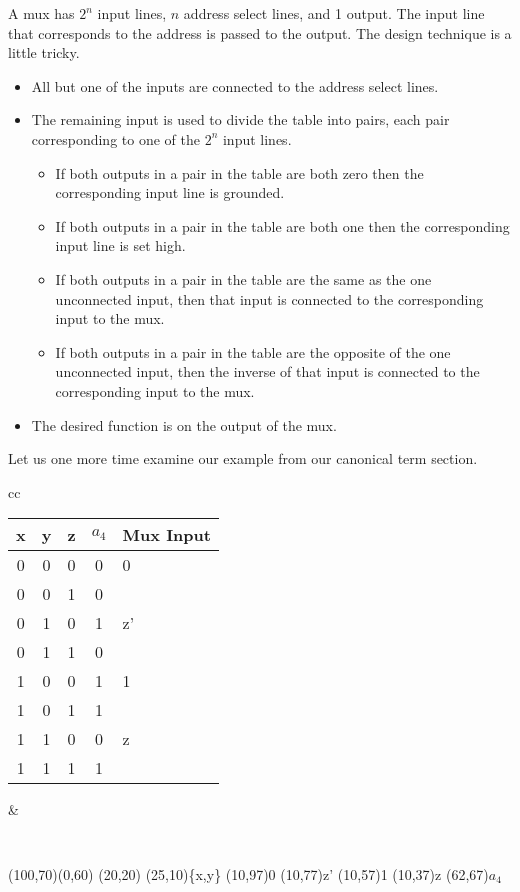 A mux has $2^n$ input lines, $n$ address select lines, and 1 output.  The input line that corresponds to the address is passed to the output.  The design technique is a little tricky.
\begin{itemize}
    \item All but one of the inputs are connected to the address select lines.
    \item The remaining input is used to divide the table into pairs, each pair corresponding to one of the $2^n$ input lines.
    \begin{itemize}
        \item If both outputs in a pair in the table are both zero then the corresponding input line is grounded.
        \item If both outputs in a pair in the table are both one then the corresponding input line is set high.
        \item If both outputs in a pair in the table are the same as the one unconnected input, then that input is connected to the corresponding input to the mux.
        \item If both outputs in a pair in the table are the opposite of the one unconnected input, then the inverse of that input is connected to the corresponding input to the mux.
    \end{itemize}
    \item The desired function is on the output of the mux.
\end{itemize}

\vspace{.1in}
Let us one more time examine our example from our canonical term section.

\begin{tabular}{cc}
\begin{tabular}{c|c|c|cl}
x & y & z & $a_4$ & Mux Input \\ \hline
0 & 0 & 0 & 0     & 0         \\
0 & 0 & 1 & 0     &           \\ \hline
0 & 1 & 0 & 1     & z'        \\
0 & 1 & 1 & 0     &           \\ \hline
1 & 0 & 0 & 1     & 1         \\
1 & 0 & 1 & 1     &           \\ \hline
1 & 1 & 0 & 0     & z         \\
1 & 1 & 1 & 1     &           \\
\end{tabular}
&
{\tt    \setlength{\unitlength}{0.92pt}
\begin{picture}(100,70)(0,60)
\put(20,20){\MuxFour}
\put(25,10){\{x,y\}}
\put(10,97){0}
\put(10,77){z'}
\put(10,57){1}
\put(10,37){z}
\put(62,67){$a_4$}
\end{picture}} \\
\end{tabular}


